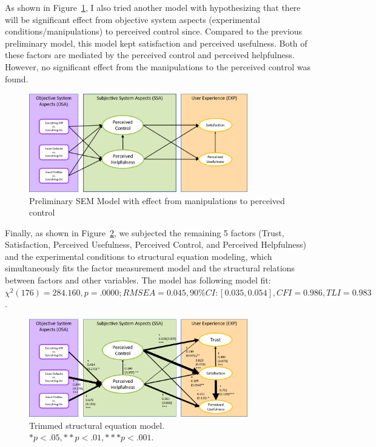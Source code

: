 As shown in Figure~\ref{fig:semmodel2}, I also tried another model with hypothesizing that there will be significant effect from objective system aspects (experimental conditions/manipulations) to perceived control since. Compared to the previous preliminary model, this model kept satisfaction and perceived usefulness. Both of these factors are mediated by the perceived control and perceived helpfulness. However, no significant effect from the manipulations to the perceived control was found.
\begin{figure}
	\centering
	\includegraphics[width=0.85\textwidth]{figures/semmodel2.png}
	\caption{Preliminary SEM Model with effect from manipulations to perceived control}
	\label{fig:semmodel2}
\end{figure}

Finally, as shown in Figure~\ref{fig:finalcoremodel}, we subjected the remaining 5 factors (Trust, Satisfaction, Perceived Usefulness, Perceived Control, and Perceived Helpfulness) and the experimental conditions to structural equation modeling, which simultaneously fits the factor measurement model and the structural relations between factors and other variables. The model has following model fit: ${\chi}^{2}(176) = 284.160, p = .0000; RMSEA = 0.045, 90\% CI: [0.035, 0.054], CFI = 0.986, TLI = 0.983$.

\begin{figure}
	\centering
	\includegraphics[width=0.85\textwidth]{figures/sem_model.png}
	\caption{ Trimmed structural equation model. $* p < .05, ** p < .01, *** p < .001$.}
	\label{fig:finalcoremodel}
\end{figure}

